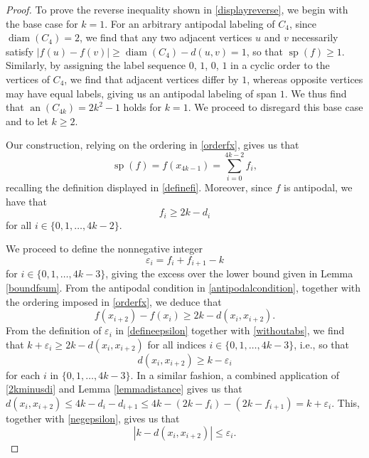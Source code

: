 \documentclass[12pt]{article}
\begin{document}
\begin{proof}
 To prove the reverse inequality shown in \eqref{displayreverse}, we begin with the base case for $ k = 1$. For an arbitrary antipodal 
 labeling of $C_{4}$, since $\operatorname{diam}(C_4) = 2$, we find that any two adjacent vertices $u$ and $v$ necessarily satisfy $| f(u) - 
 f(v) | \geq \operatorname{diam}(C_4) - d(u, v) = 1$, 
 so that $\operatorname{sp}(f) \geq 1$. 
 Similarly, by assigning the label sequence $0$, $1$, $0$, $1$
 in a cyclic order to the vertices of $C_{4}$, we find that adjacent vertices differ by $1$, whereas opposite vertices
 may have equal labels, giving us an antipodal labeling of span $1$. 
 We thus find that $\operatorname{an}(C_{4k}) = 2k^2 - 1$ holds for $k = 1$. 
 We proceed to disregard this base case and to let $k \geq 2$. 

 Our construction, relying on the ordering in \eqref{orderfx}, gives us that 
\begin{equation}\label{evaluatespf} 
 \operatorname{sp}(f) = f(x_{4k-1}) = \sum_{i=0}^{4k-2} f_{i}, 
\end{equation} 
 recalling the definition displayed in \eqref{definefi}. 
 Moreover, since $f$ is antipodal, we have that 
\begin{equation}\label{2kminusdi} 
 f_{i} \geq 2 k - d_i 
\end{equation}
 for all $i \in \{ 0, 1, \ldots, 4k - 2 \}$. 

 We proceed to define the nonnegative integer
\begin{equation}\label{defineepsilon} 
 \varepsilon_{i} = f_{i} + f_{i+1} - k 
\end{equation}
 for $i \in \{ 0, 1, \ldots, 4k-3 \}$, giving the excess over the lower bound given in Lemma \ref{boundfsum}. From the antipodal condition in 
 \eqref{antipodalcondition}, together with 
 the ordering imposed in \eqref{orderfx}, 
 we deduce that 
\begin{equation}\label{withoutabs}
 f(x_{i + 2}) - f(x_{i}) \geq 2 k - d(x_i, x_{i+2}). 
\end{equation}
 From the definition of $\varepsilon_i$ in \eqref{defineepsilon} together
 with \eqref{withoutabs}, we find that 
 $ k + \varepsilon_i \geq 2 k - d(x_i, x_{i+2}) $
 for all indices $i \in \{ 0, 1, \ldots, 4 k - 3 \}$, 
 i.e., so that 
\begin{equation}\label{negepsilon} 
 d(x_{i}, x_{i+2}) \geq k - \varepsilon_{i} 
\end{equation}
 for each $i$ in $ \{ 0, 1, \ldots, 4 k - 3 \}$. 
 In a similar fashion, a combined application of \eqref{2kminusdi}
 and Lemma \ref{lemmadistance} gives us that $ d(x_{i}, x_{i+2}) \leq 4 k - d_i - d_{i+1} \leq 4 k - (2 k - f_i) - 
 (2 k - f_{i+1}) = k +\varepsilon_i$. This, together with \eqref{negepsilon}, gives us that 
\begin{equation}\label{boundabs} 
 \left| k - d(x_i, x_{i+2}) \right| \leq \varepsilon_i. 
\end{equation}


\end{proof}
\end{document}
